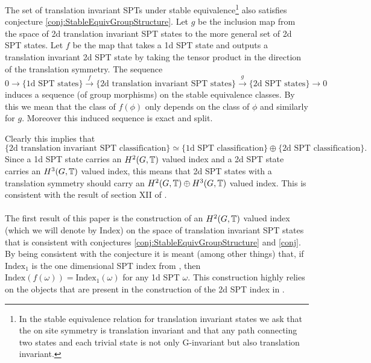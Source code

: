 \documentclass[12pt,a4paper,twoside]{article}
\numberwithin{equation}{section}
\begin{document}
\begin{conjecture}\label{conj}
	The set of translation invariant SPTs under stable equivalence\footnote{In the stable equivalence relation for translation invariant states we ask that the on site symmetry is translation invariant and that any path connecting two states and each trivial state is not only G-invariant but also translation invariant.} also satisfies conjecture \ref{conj:StableEquivGroupStructure}. Let $g$ be the inclusion map from the space of 2d translation invariant SPT states to the more general set of 2d SPT states. Let $f$ be the map that takes a 1d SPT state and outputs a translation invariant 2d SPT state by taking the tensor product in the direction of the translation symmetry. The sequence
	\begin{equation}
		0\rightarrow\{\text{1d SPT states}\}\stackrel{f}{\rightarrow}\{\text{2d translation invariant SPT states}\}\stackrel{g}{\rightarrow}\{\text{2d SPT states}\}\rightarrow 0
	\end{equation}
	induces a sequence (of group morphisms) on the stable equivalence classes. By this we mean that the class of $f(\phi)$ only depends on the class of $\phi$ and similarly for $g$. Moreover this induced sequence is exact and split.
\end{conjecture}
Clearly this implies that
\begin{equation}
	\{\text{2d translation invariant SPT classification}\}\simeq \{\text{1d SPT classification}\}\oplus \{\text{2d SPT classification}\}.
\end{equation}
Since a 1d SPT state carries an $H^2(G,\mathbb T)$ valued index and a 2d SPT state carries an $H^3(G,\mathbb T)$ valued index, this means that 2d SPT states with a translation symmetry should carry an $H^2(G,\mathbb T)\oplus H^3(G,\mathbb T)$ valued index. This is consistent with the result of section XII of \cite{Chen_2013}.
\\\\
The first result of this paper is the construction of an $H^2(G,\mathbb T)$ valued index (which we will denote by $\textrm{Index}$) on the space of translation invariant SPT states that is consistent with conjectures \ref{conj:StableEquivGroupStructure} and \ref{conj}. By being consistent with the conjecture it is meant (among other things) that, if $\textrm{Index}_1$ is the one dimensional SPT index from \cite{ogata2019classification}, then $\textrm{Index}(f(\omega))=\textrm{Index}_1(\omega)$ for any 1d SPT $\omega$. This construction highly relies on the objects that are present in the construction of the 2d SPT index in \cite{ogata2021h3gmathbb}.
\end{document}
